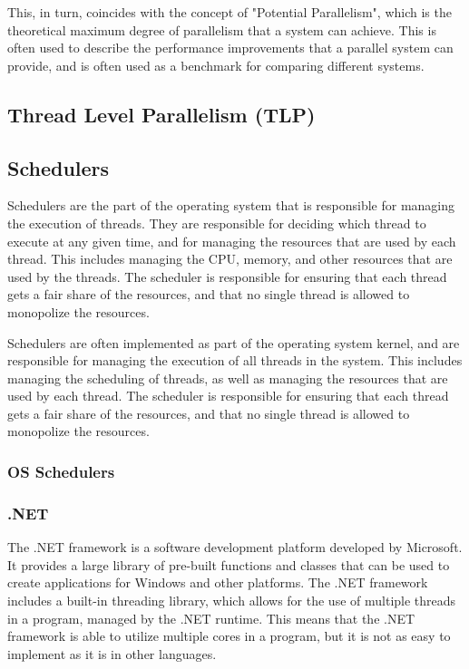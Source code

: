 \documentclass[12pt,a4paper]{article}
\begin{document}
This, in turn, coincides with the concept of "Potential Parallelism", which is the theoretical maximum degree of parallelism that a system can achieve. This is often used to describe the performance improvements that a parallel system can provide, and is often used as a benchmark for comparing different systems.

\subsection{Thread Level Parallelism (TLP)}

\subsection{Schedulers}

Schedulers are the part of the operating system that is responsible for managing the execution of threads. They are responsible for deciding which thread to execute at any given time, and for managing the resources that are used by each thread. This includes managing the CPU, memory, and other resources that are used by the threads. The scheduler is responsible for ensuring that each thread gets a fair share of the resources, and that no single thread is allowed to monopolize the resources.

Schedulers are often implemented as part of the operating system kernel, and are responsible for managing the execution of all threads in the system. This includes managing the scheduling of threads, as well as managing the resources that are used by each thread. The scheduler is responsible for ensuring that each thread gets a fair share of the resources, and that no single thread is allowed to monopolize the resources.

\subsubsection{OS Schedulers}


\subsubsection{.NET}

The .NET framework is a software development platform developed by Microsoft. It provides a large library of pre-built functions and classes that can be used to create applications for Windows and other platforms. The .NET framework includes a built-in threading library, which allows for the use of multiple threads in a program, managed by the .NET runtime. This means that the .NET framework is able to utilize multiple cores in a program, but it is not as easy to implement as it is in other languages.
\end{document}
